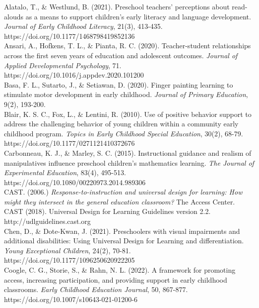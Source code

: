 \documentclass[11.5pt]{sig-alternate}
\begin{document}
Alatalo, T., \& Westlund, B. (2021). Preschool teachers’ perceptions about read-alouds as a 
means to support children’s early literacy and language development. \textit{Journal of Early Childhood Literacy}, 21(3), 413-435.\\ https://doi.org/10.1177/1468798419852136 
\\

Ansari, A., Hofkens, T. L., \& Pianta, R. C. (2020). Teacher-student relationships across the first 
seven years of education and adolescent outcomes. \textit{Journal of Applied Developmental Psychology}, 71. \\https://doi.org/10.1016/j.appdev.2020.101200 
\\

Basa, F. L., Sutarto, J., \& Setiawan, D. (2020). Finger painting learning to stimulate motor 
development in early childhood. \textit{Journal of Primary Education}, 9(2), 193-200.
\\

Blair, K. S. C., Fox, L., \& Lentini, R. (2010). Use of positive behavior support to address the 
challenging behavior of young children within a community early childhood program. \textit{Topics in Early Childhood Special Education}, 30(2), 68-79. 
https://doi.org/10.1177/0271121410372676 
\\

Carbonneau, K. J., \& Marley, S. C. (2015). Instructional guidance and realism of manipulatives 
influence preschool children’s mathematics learning. \textit{The Journal of Experimental Education}, 83(4), 495-513. \\ https://doi.org/10.1080/00220973.2014.989306 
\\

CAST. (2006.) \textit{Response-to-instruction and universal design for learning: How might they 
intersect in the general education classroom?} The Access Center.
CAST (2018). Universal Design for Learning Guidelines version 2.2. 
http://udlguidelines.cast.org
\\
\newpage
Chen, D., \& Dote-Kwan, J. (2021). Preschoolers with visual impairments and additional disabilities: Using Universal Design for Learning and differentiation. \textit{Young Exceptional Children}, 24(2), 70-81. \\https://doi.org/10.1177/1096250620922205 
\\

Coogle, C. G., Storie, S., \& Rahn, N. L. (2022). A framework for promoting access, increasing 
participation, and providing support in early childhood classrooms. \textit{Early Childhood Education Journal}, 50, 867-877. \\https://doi.org/10.1007/s10643-021-01200-6 
\\
\end{document}
